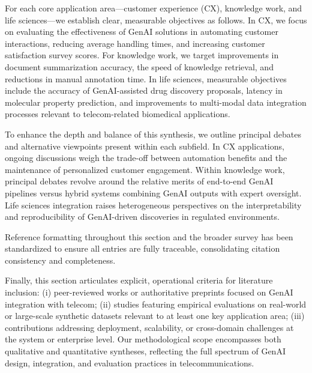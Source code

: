 \documentclass[sigconf]{acmart}
\begin{document}
For each core application area---customer experience (CX), knowledge work, and life sciences---we establish clear, measurable objectives as follows. In CX, we focus on evaluating the effectiveness of GenAI solutions in automating customer interactions, reducing average handling times, and increasing customer satisfaction survey scores. For knowledge work, we target improvements in document summarization accuracy, the speed of knowledge retrieval, and reductions in manual annotation time. In life sciences, measurable objectives include the accuracy of GenAI-assisted drug discovery proposals, latency in molecular property prediction, and improvements to multi-modal data integration processes relevant to telecom-related biomedical applications.

To enhance the depth and balance of this synthesis, we outline principal debates and alternative viewpoints present within each subfield. In CX applications, ongoing discussions weigh the trade-off between automation benefits and the maintenance of personalized customer engagement. Within knowledge work, principal debates revolve around the relative merits of end-to-end GenAI pipelines versus hybrid systems combining GenAI outputs with expert oversight. Life sciences integration raises heterogeneous perspectives on the interpretability and reproducibility of GenAI-driven discoveries in regulated environments.

Reference formatting throughout this section and the broader survey has been standardized to ensure all entries are fully traceable, consolidating citation consistency and completeness.

Finally, this section articulates explicit, operational criteria for literature inclusion: (i) peer-reviewed works or authoritative preprints focused on GenAI integration with telecom; (ii) studies featuring empirical evaluations on real-world or large-scale synthetic datasets relevant to at least one key application area; (iii) contributions addressing deployment, scalability, or cross-domain challenges at the system or enterprise level. Our methodological scope encompasses both qualitative and quantitative syntheses, reflecting the full spectrum of GenAI design, integration, and evaluation practices in telecommunications.
\end{document}
